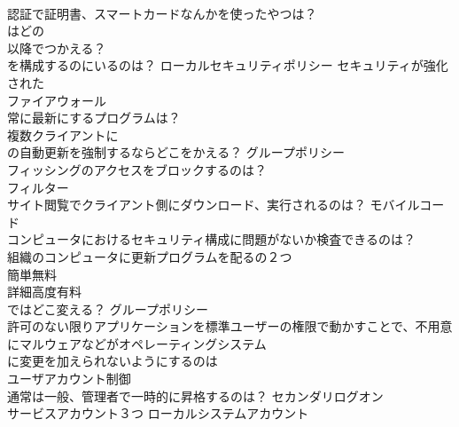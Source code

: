 \documentclass[8pt]{extreport}
\begin{document}
\begin{CJK}{UTF8}{min}
\\	認証で証明書、スマートカードなんかを使ったやつは？	
\\	はどの
\\	以降でつかえる？	
\\	を構成するのにいるのは？	ローカルセキュリティポリシー セキュリティが強化された
\\	ファイアウォール
\\	常に最新にするプログラムは？	
\\	複数クライアントに
\\	の自動更新を強制するならどこをかえる？	グループポリシー
\\	フィッシングのアクセスをブロックするのは？	
\\	フィルター
\\	サイト閲覧でクライアント側にダウンロード、実行されるのは？	モバイルコード
\\	コンピュータにおけるセキュリティ構成に問題がないか検査できるのは？	
\\	組織のコンピュータに更新プログラムを配るの２つ	
\\	簡単無料 
\\	詳細高度有料
\\	ではどこ変える？	グループポリシー
\\	許可のない限りアプリケーションを標準ユーザーの権限で動かすことで、不用意にマルウェアなどがオペレーティングシステム 
\\	に変更を加えられないようにするのは	
\\	ユーザアカウント制御
\\	通常は一般、管理者で一時的に昇格するのは？	セカンダリログオン
\\	サービスアカウント３つ	ローカルシステムアカウント　
\end{CJK}
\end{document}
